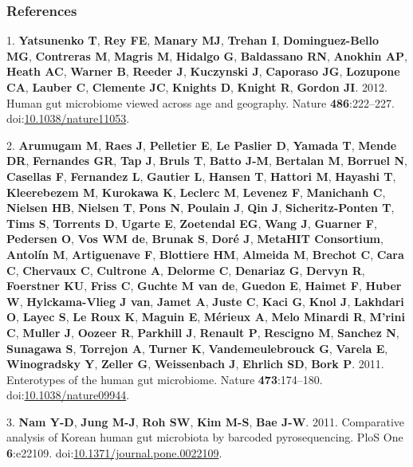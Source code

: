 \documentclass[12pt,]{article}
\begin{document}
\subsubsection*{References}\label{references}

\hypertarget{refs}{}
\hypertarget{ref-yatsunenkoux5fhumanux5f2012}{}
1. \textbf{Yatsunenko T}, \textbf{Rey FE}, \textbf{Manary MJ},
\textbf{Trehan I}, \textbf{Dominguez-Bello MG}, \textbf{Contreras M},
\textbf{Magris M}, \textbf{Hidalgo G}, \textbf{Baldassano RN},
\textbf{Anokhin AP}, \textbf{Heath AC}, \textbf{Warner B},
\textbf{Reeder J}, \textbf{Kuczynski J}, \textbf{Caporaso JG},
\textbf{Lozupone CA}, \textbf{Lauber C}, \textbf{Clemente JC},
\textbf{Knights D}, \textbf{Knight R}, \textbf{Gordon JI}. 2012. Human
gut microbiome viewed across age and geography. Nature
\textbf{486}:222--227.
doi:\href{https://doi.org/10.1038/nature11053}{10.1038/nature11053}.

\hypertarget{ref-arumugamux5fenterotypesux5f2011}{}
2. \textbf{Arumugam M}, \textbf{Raes J}, \textbf{Pelletier E},
\textbf{Le Paslier D}, \textbf{Yamada T}, \textbf{Mende DR},
\textbf{Fernandes GR}, \textbf{Tap J}, \textbf{Bruls T}, \textbf{Batto
J-M}, \textbf{Bertalan M}, \textbf{Borruel N}, \textbf{Casellas F},
\textbf{Fernandez L}, \textbf{Gautier L}, \textbf{Hansen T},
\textbf{Hattori M}, \textbf{Hayashi T}, \textbf{Kleerebezem M},
\textbf{Kurokawa K}, \textbf{Leclerc M}, \textbf{Levenez F},
\textbf{Manichanh C}, \textbf{Nielsen HB}, \textbf{Nielsen T},
\textbf{Pons N}, \textbf{Poulain J}, \textbf{Qin J},
\textbf{Sicheritz-Ponten T}, \textbf{Tims S}, \textbf{Torrents D},
\textbf{Ugarte E}, \textbf{Zoetendal EG}, \textbf{Wang J},
\textbf{Guarner F}, \textbf{Pedersen O}, \textbf{Vos WM de},
\textbf{Brunak S}, \textbf{Doré J}, \textbf{MetaHIT Consortium},
\textbf{Antolín M}, \textbf{Artiguenave F}, \textbf{Blottiere HM},
\textbf{Almeida M}, \textbf{Brechot C}, \textbf{Cara C},
\textbf{Chervaux C}, \textbf{Cultrone A}, \textbf{Delorme C},
\textbf{Denariaz G}, \textbf{Dervyn R}, \textbf{Foerstner KU},
\textbf{Friss C}, \textbf{Guchte M van de}, \textbf{Guedon E},
\textbf{Haimet F}, \textbf{Huber W}, \textbf{Hylckama-Vlieg J van},
\textbf{Jamet A}, \textbf{Juste C}, \textbf{Kaci G}, \textbf{Knol J},
\textbf{Lakhdari O}, \textbf{Layec S}, \textbf{Le Roux K},
\textbf{Maguin E}, \textbf{Mérieux A}, \textbf{Melo Minardi R},
\textbf{M'rini C}, \textbf{Muller J}, \textbf{Oozeer R},
\textbf{Parkhill J}, \textbf{Renault P}, \textbf{Rescigno M},
\textbf{Sanchez N}, \textbf{Sunagawa S}, \textbf{Torrejon A},
\textbf{Turner K}, \textbf{Vandemeulebrouck G}, \textbf{Varela E},
\textbf{Winogradsky Y}, \textbf{Zeller G}, \textbf{Weissenbach J},
\textbf{Ehrlich SD}, \textbf{Bork P}. 2011. Enterotypes of the human gut
microbiome. Nature \textbf{473}:174--180.
doi:\href{https://doi.org/10.1038/nature09944}{10.1038/nature09944}.

\hypertarget{ref-namux5fcomparativeux5f2011}{}
3. \textbf{Nam Y-D}, \textbf{Jung M-J}, \textbf{Roh SW}, \textbf{Kim
M-S}, \textbf{Bae J-W}. 2011. Comparative analysis of Korean human gut
microbiota by barcoded pyrosequencing. PloS One \textbf{6}:e22109.
doi:\href{https://doi.org/10.1371/journal.pone.0022109}{10.1371/journal.pone.0022109}.
\end{document}
